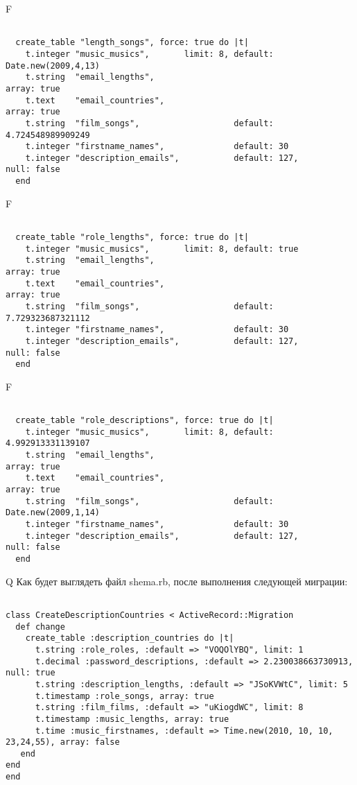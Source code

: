 F
\begin{verbatim}

  create_table "length_songs", force: true do |t|
    t.integer "music_musics",       limit: 8, default: Date.new(2009,4,13)
    t.string  "email_lengths",                                                  array: true
    t.text    "email_countries",                                                array: true
    t.string  "film_songs",                   default: 4.724548989909249
    t.integer "firstname_names",              default: 30
    t.integer "description_emails",           default: 127,        null: false
  end

\end{verbatim}

F
\begin{verbatim}

  create_table "role_lengths", force: true do |t|
    t.integer "music_musics",       limit: 8, default: true
    t.string  "email_lengths",                                                  array: true
    t.text    "email_countries",                                                array: true
    t.string  "film_songs",                   default: 7.729323687321112
    t.integer "firstname_names",              default: 30
    t.integer "description_emails",           default: 127,        null: false
  end

\end{verbatim}

F
\begin{verbatim}

  create_table "role_descriptions", force: true do |t|
    t.integer "music_musics",       limit: 8, default: 4.992913331139107
    t.string  "email_lengths",                                                  array: true
    t.text    "email_countries",                                                array: true
    t.string  "film_songs",                   default: Date.new(2009,1,14)
    t.integer "firstname_names",              default: 30
    t.integer "description_emails",           default: 127,        null: false
  end

\end{verbatim}

Q
Как будет выглядеть файл shema.rb, после выполнения следующей миграции:

\begin{verbatim}

class CreateDescriptionCountries < ActiveRecord::Migration 
  def change 
    create_table :description_countries do |t| 
      t.string :role_roles, :default => "VOQOlYBQ", limit: 1
      t.decimal :password_descriptions, :default => 2.230038663730913, null: true
      t.string :description_lengths, :default => "JSoKVWtC", limit: 5
      t.timestamp :role_songs, array: true
      t.string :film_films, :default => "uKiogdWC", limit: 8
      t.timestamp :music_lengths, array: true
      t.time :music_firstnames, :default => Time.new(2010, 10, 10, 23,24,55), array: false
   end
end
end
\end{verbatim}

